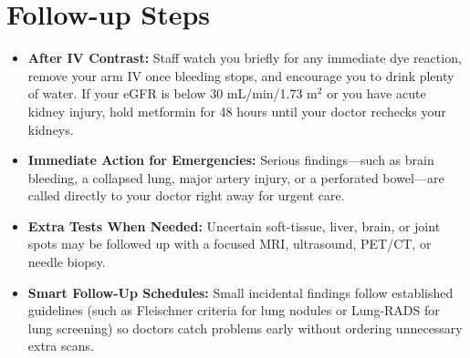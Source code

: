 \section{Follow-up Steps}
\begin{itemize}
    \item \textbf{After IV Contrast:} Staff watch you briefly for any immediate dye reaction, remove your arm IV once bleeding stops, and encourage you to drink plenty of water. If your eGFR is below 30 mL/min/1.73 m$^2$ or you have acute kidney injury, hold metformin for 48 hours until your doctor rechecks your kidneys.
    \item \textbf{Immediate Action for Emergencies:} Serious findings---such as brain bleeding, a collapsed lung, major artery injury, or a perforated bowel---are called directly to your doctor right away for urgent care.
    \item \textbf{Extra Tests When Needed:} Uncertain soft-tissue, liver, brain, or joint spots may be followed up with a focused MRI, ultrasound, PET/CT, or needle biopsy.
    \item \textbf{Smart Follow-Up Schedules:} Small incidental findings follow established guidelines (such as Fleischner criteria for lung nodules or Lung-RADS for lung screening) so doctors catch problems early without ordering unnecessary extra scans.
\end{itemize}


